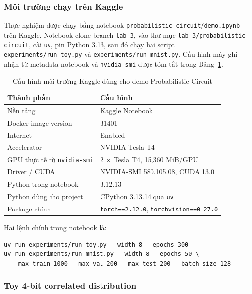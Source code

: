 \subsubsection{Môi trường chạy trên Kaggle}

Thực nghiệm được chạy bằng notebook \texttt{probabilistic-circuit/demo.ipynb}
trên Kaggle. Notebook clone branch \texttt{lab-3}, vào thư mục
\texttt{lab-3/probabilistic-circuit}, cài \texttt{uv}, pin Python 3.13, sau đó
chạy hai script \texttt{experiments/run\_toy.py} và
\texttt{experiments/run\_mnist.py}. Cấu hình máy ghi nhận từ metadata notebook và
\texttt{nvidia-smi} được tóm tắt trong Bảng~\ref{tab:pc-kaggle-env}.

\begin{table}[H]
\centering
\caption{Cấu hình môi trường Kaggle dùng cho demo Probabilistic Circuit}
\label{tab:pc-kaggle-env}
\renewcommand{\arraystretch}{1.2}
\begin{tabular}{ll}
\toprule
\textbf{Thành phần} & \textbf{Cấu hình} \\
\midrule
Nền tảng & Kaggle Notebook \\
Docker image version & 31401 \\
Internet & Enabled \\
Accelerator & NVIDIA Tesla T4 \\
GPU thực tế từ \texttt{nvidia-smi} & 2 $\times$ Tesla T4, 15,360 MiB/GPU \\
Driver / CUDA & NVIDIA-SMI 580.105.08, CUDA 13.0 \\
Python trong notebook & 3.12.13 \\
Python dùng cho project & CPython 3.13.14 qua \texttt{uv} \\
Package chính & \texttt{torch==2.12.0}, \texttt{torchvision==0.27.0} \\
\bottomrule
\end{tabular}
\end{table}

Hai lệnh chính trong notebook là:
\begin{verbatim}
uv run experiments/run_toy.py --width 8 --epochs 300
uv run experiments/run_mnist.py --width 8 --epochs 50 \
  --max-train 1000 --max-val 200 --max-test 200 --batch-size 128
\end{verbatim}

\subsubsection{Toy 4-bit correlated distribution}

